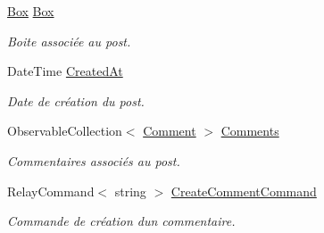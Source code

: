 \begin{DoxyCompactItemize}
\hyperlink{class_boxes_1_1_models_1_1_box}{Box} \hyperlink{class_boxes_1_1_view_models_1_1_post_view_model_a4914850f18b637c7b94c176b5de6543a}{Box}
\begin{DoxyCompactList}\small\item\em Boite associée au post. \end{DoxyCompactList}\item 
Date\+Time \hyperlink{class_boxes_1_1_view_models_1_1_post_view_model_a8209232998d5fc35e9f1ec3198efd0d4}{Created\+At}
\begin{DoxyCompactList}\small\item\em Date de création du post. \end{DoxyCompactList}\item 
Observable\+Collection$<$ \hyperlink{class_boxes_1_1_models_1_1_comment}{Comment} $>$ \hyperlink{class_boxes_1_1_view_models_1_1_post_view_model_a2072fc7bf6be05be6f79ac11f6398350}{Comments}
\begin{DoxyCompactList}\small\item\em Commentaires associés au post. \end{DoxyCompactList}\item 
Relay\+Command$<$ string $>$ \hyperlink{class_boxes_1_1_view_models_1_1_post_view_model_ac3f6e6b6da43952f994401063ff450e1}{Create\+Comment\+Command}
\begin{DoxyCompactList}\small\item\em Commande de création d\textquotesingle{}un commentaire. \end{DoxyCompactList}\end{DoxyCompactItemize}

